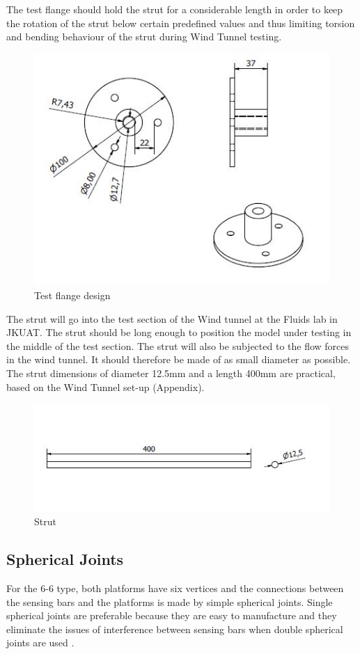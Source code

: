 The test flange should hold the strut for a considerable length in order to keep the rotation of the strut below certain predefined values and thus limiting torsion and bending behaviour of the strut during Wind Tunnel testing.
\begin{center}
	\begin{figure}[H]
	\centering
	\includegraphics[width=0.75\linewidth]{Figures/Test}
	\caption[Test flange]{Test flange design}
	\end{figure}
\end{center}
The strut will go into the test section of the Wind tunnel at the Fluids lab in JKUAT. The strut should be long enough to position the model under testing in the middle of the test section. The strut will also be subjected to the flow forces in the wind tunnel. It should therefore be made of as small diameter as possible. The strut dimensions of diameter 12.5mm and a length 400mm are practical, based on the Wind Tunnel set-up (Appendix).
\begin{center}
	\begin{figure}[H]
	\centering
	\includegraphics[width=0.75\linewidth]{Figures/Strut}
	\caption[Strut]{Strut}
	\end{figure}
\end{center}

\subsection{Spherical Joints}
For the 6-6 type, both platforms have six vertices and
the connections between the sensing bars and the platforms is made by simple spherical joints. Single spherical joints are preferable because they are easy to manufacture and they eliminate the issues of interference between sensing bars when double spherical joints are used \cite{fernandes_design_nodate}.  

